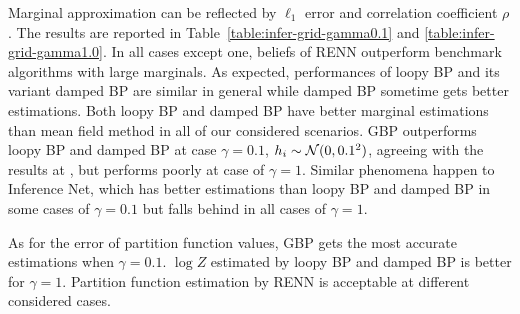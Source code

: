 \begin{table*}[t]
\begin{center}
\begin{small}
\begin{tabular}{lcccccccc}



          

          \bottomrule
        \end{tabular}
      
    \end{small}
  \end{center}
  \vskip -0.2in
\end{table*}

Marginal approximation can be reflected by $\ell_1$ error and correlation coefficient $\rho$. The results are reported in Table~\ref{table:infer-grid-gamma0.1} and \ref{table:infer-grid-gamma1.0}. In all cases except one, beliefs of RENN outperform benchmark algorithms with large marginals. As expected, performances of loopy BP and its variant damped BP are similar in general while damped BP sometime gets better estimations. Both loopy BP and damped BP have better marginal estimations than mean field method in all of our considered scenarios. GBP outperforms loopy BP and damped BP at case $\gamma=0.1$, $h_i\sim \mathcal{N}(0,0.1^2)$, agreeing with the results at \cite{yedida2005constucting}, but performs poorly at case of $\gamma=1$. Similar phenomena happen to Inference Net, which has better estimations than loopy BP and damped BP in some cases of $\gamma=0.1$ but falls behind in all cases of $\gamma=1$.


As for the error of partition function values, GBP gets the most accurate estimations when $\gamma=0.1$. $\log{Z}$ estimated by loopy BP and damped BP is better for $\gamma=1$. Partition function estimation by RENN is acceptable at different considered cases.

